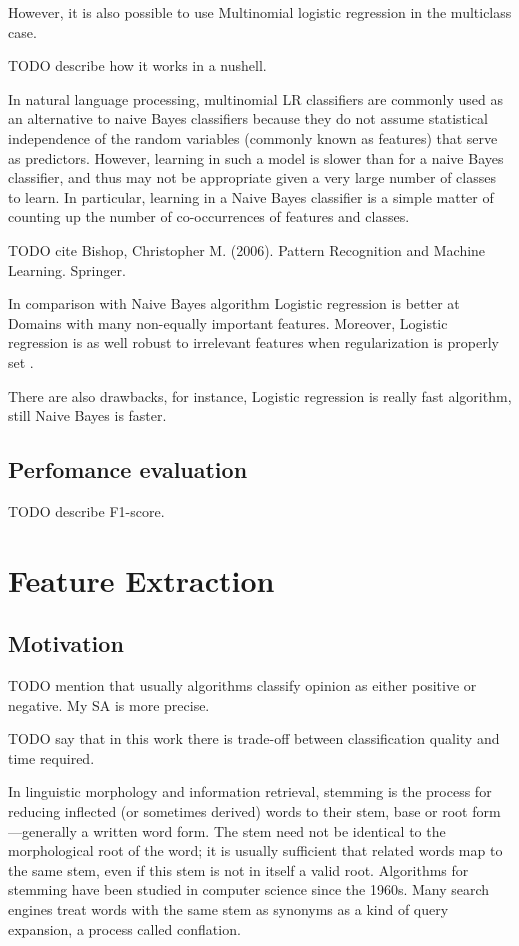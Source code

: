 \documentclass[12pt]{report}
\begin{document}
However, it is also possible to use Multinomial logistic regression in the multiclass case.

TODO describe how it works in a nushell.

In natural language processing, multinomial LR classifiers are commonly used as an alternative to naive Bayes classifiers because they do not assume statistical independence of the random variables (commonly known as features) that serve as predictors. However, learning in such a model is slower than for a naive Bayes classifier, and thus may not be appropriate given a very large number of classes to learn. In particular, learning in a Naive Bayes classifier is a simple matter of counting up the number of co-occurrences of features and classes.

TODO cite  Bishop, Christopher M. (2006). Pattern Recognition and Machine Learning. Springer.

In comparison with Naive Bayes algorithm Logistic regression is better at Domains with many non-equally important features. Moreover, Logistic regression is as well robust to irrelevant features when regularization is properly set \cite{kevinPMuprhy}.

There are also drawbacks, for instance, Logistic regression is really fast algorithm, still Naive Bayes is faster.

\newpage

\section{Perfomance evaluation}

TODO describe F1-score.

\newpage

\chapter{Feature Extraction}

\section{Motivation}

TODO mention that usually algorithms classify opinion as either positive or negative. My SA is more precise.

TODO say that in this work there is trade-off between classification quality and time required.

In linguistic morphology and information retrieval, stemming is the process for reducing inflected (or sometimes derived) words to their stem, base or root form—generally a written word form. The stem need not be identical to the morphological root of the word; it is usually sufficient that related words map to the same stem, even if this stem is not in itself a valid root. Algorithms for stemming have been studied in computer science since the 1960s. Many search engines treat words with the same stem as synonyms as a kind of query expansion, a process called conflation.
\end{document}
